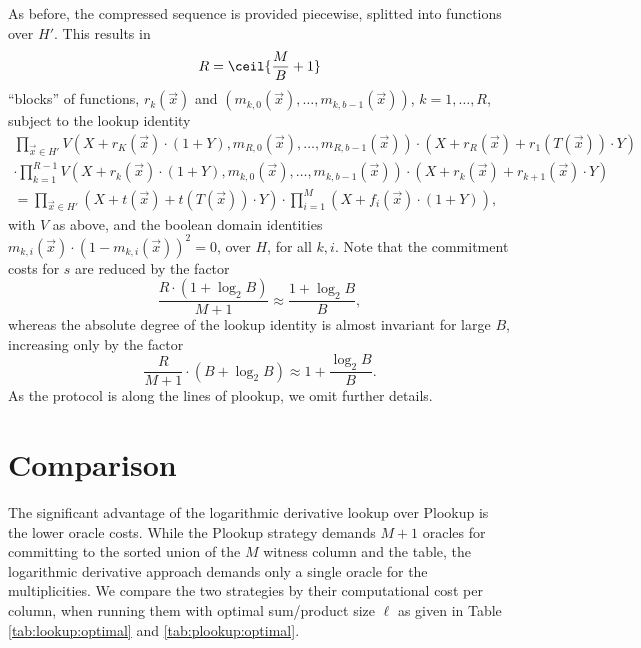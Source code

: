 \documentclass[11pt]{article}
\theoremstyle{definition}
\theoremstyle{definition}
\begin{document}
As before, the compressed sequence is provided piecewise, splitted into functions over $H'$. 
This results in
\[
R = \ceil{\frac{M}{B}+ 1} 
\]
``blocks'' of functions, $r_k(\vec x)$ and $( m_{k,0}(\vec x),\ldots,  m_{k, b-1}(\vec x))$, $k=1,\ldots, R$, subject to 
the lookup identity
\begin{multline*}
\prod_{\vec x\in H'} 
V(X +  r_K(\vec x) \cdot (1 + Y), m_{R,0}(\vec x),\ldots, m_{R,b-1}(\vec x)) \cdot (X +  r_{R}(\vec x) +  r_{1}(T(\vec x))\cdot Y)
\\
\cdot 
\prod_{k=1}^{R-1}
V(X +  r_k(\vec x) \cdot (1 + Y), m_{k,0}(\vec x),\ldots, m_{k,b-1}(\vec x)) \cdot (X +  r_{k}(\vec x) +  r_{k+1}(\vec x)\cdot Y)
\\
= \prod_{\vec x\in H'} (X + t(\vec x) + t(T(\vec x))\cdot Y) \cdot \prod_{i=1}^M (X + f_i(\vec x)\cdot (1 + Y)),
\end{multline*}
with $V$ as above, and the boolean domain identities $m_{k,i}(\vec x)\cdot (1 - m_{k,i}(\vec x))^2 = 0$,
over $H$, for all $k, i$.
Note that the commitment costs for $s$ are reduced by the factor 
\[
\frac{R\cdot (1 + \log_2 B)}{M+1} \approx \frac{1 + \log_2 B}{B},
\]
whereas the absolute degree of the lookup identity is almost invariant for large $B$, increasing only by the factor
\[
\frac{R}{M+1}\cdot (B + \log_2 B) \approx 1 + \frac{\log_2 B}{B}.
\]
As the protocol is along the lines of plookup, we omit further details.







\section{Comparison}


The significant advantage of the logarithmic derivative lookup over Plookup is the lower oracle costs.
While the Plookup strategy demands $M + 1$ oracles for committing to the sorted union of the $M$ witness column and the table, the logarithmic derivative approach demands only a single oracle for the multiplicities.
We compare the two strategies by their computational cost per column, when running them with optimal sum/product size $\ell$ as given in Table \ref{tab:lookup:optimal} and \ref{tab:plookup:optimal}.
\end{document}
